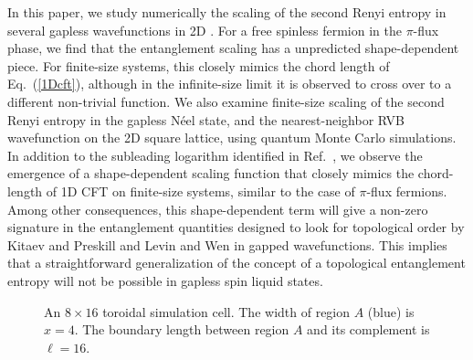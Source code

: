 \documentclass[prl,aps,twocolumn,floatfix,amsmath,amssymb,superscriptaddress,tightenlines]{revtex4}
\begin{document}
In this paper, we study numerically the scaling of the second Renyi entropy in several gapless wavefunctions in 2D \cite{Misguich}.
For a free spinless fermion in the $\pi$-flux phase, we find that the entanglement scaling has a unpredicted shape-dependent piece.
For finite-size systems, this closely mimics the chord length of Eq.~(\ref{1Dcft}), although in the infinite-size limit 
it is observed to cross over to a different non-trivial function.
We also examine finite-size scaling of the second Renyi entropy in the gapless N\'eel state, and the nearest-neighbor RVB wavefunction
on the 2D square lattice, using quantum Monte Carlo simulations.
In addition to the subleading logarithm identified in Ref.~\cite{HeisLog},
we observe the emergence of a shape-dependent scaling function that closely mimics the chord-length of 1D CFT on finite-size systems, similar to the case of $\pi$-flux fermions.
Among other consequences, this shape-dependent term will give a non-zero signature in the entanglement quantities designed to look for topological order by Kitaev and Preskill \cite{KP} and Levin and Wen \cite{LW} in gapped wavefunctions.  This implies that a straightforward generalization of the concept of a topological entanglement entropy will not be possible in gapless spin liquid states.



 \begin{figure}[ht]
   \begin{center}
   \end{center}
   \caption{An $8 \times 16$ toroidal simulation cell.  The width of region $A$ (blue) is $x=4$.  The boundary length between region $A$ and its complement is $\ell = 16$. }
   \label{fig:torus}
 \end{figure}
 
\end{document}
